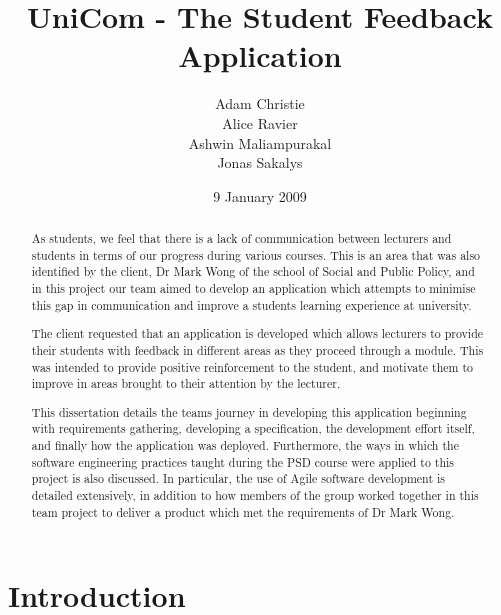 \documentclass{l3proj}
\begin{document}
\title{UniCom - The Student Feedback Application}

\author{Adam Christie \\
        Alice Ravier \\
        Ashwin Maliampurakal \\
        Jonas Sakalys}

\date{9 January 2009}

\maketitle

\begin{abstract}

As students, we feel that there is a lack of communication between lecturers and students in terms of our progress during various courses. This is an area that was also identified by the client, Dr Mark Wong of the school of Social and Public Policy, and in this project our team aimed to develop an application which attempts to minimise this gap in communication and improve a students learning experience at university.

The client requested that an application is developed which allows lecturers to provide their students with feedback in different areas as they proceed through a module. This was intended to provide positive reinforcement to the student, and motivate them to improve in areas brought to their attention by the lecturer.

This dissertation details the teams journey in developing this application beginning with requirements gathering, developing a specification, the development effort itself, and finally how the application was deployed. Furthermore, the ways in which the software engineering practices taught during the PSD course were applied to this project is also discussed. In particular, the use of Agile software development is detailed extensively, in addition to how members of the group worked together in this team project to deliver a product which met the requirements of Dr Mark Wong.

\end{abstract}

\educationalconsent

\newpage

\section{Introduction}
\end{document}

